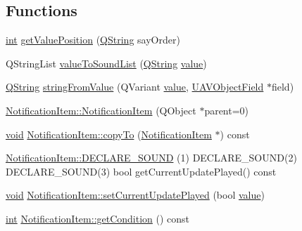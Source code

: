 \subsection*{Functions}
\begin{DoxyCompactItemize}
\item 
\hyperlink{ioapi_8h_a787fa3cf048117ba7123753c1e74fcd6}{int} \hyperlink{group__notifyplugin_ga86b5587da919e4abd0c5045f8eef27ae}{get\-Value\-Position} (\hyperlink{group___u_a_v_objects_plugin_gab9d252f49c333c94a72f97ce3105a32d}{Q\-String} say\-Order)
\item 
Q\-String\-List \hyperlink{group__notifyplugin_ga52304989291ca82805ab0749694bfbce}{value\-To\-Sound\-List} (\hyperlink{group___u_a_v_objects_plugin_gab9d252f49c333c94a72f97ce3105a32d}{Q\-String} \hyperlink{glext_8h_aa0e2e9cea7f208d28acda0480144beb0}{value})
\item 
\hyperlink{group___u_a_v_objects_plugin_gab9d252f49c333c94a72f97ce3105a32d}{Q\-String} \hyperlink{group__notifyplugin_ga16f7f909377f59dda529965c201a37a8}{string\-From\-Value} (Q\-Variant \hyperlink{glext_8h_aa0e2e9cea7f208d28acda0480144beb0}{value}, \hyperlink{class_u_a_v_object_field}{U\-A\-V\-Object\-Field} $\ast$field)
\item 
\hyperlink{group__notifyplugin_ga382be87567eab960b4bd89e2c7238ba8}{Notification\-Item\-::\-Notification\-Item} (Q\-Object $\ast$parent=0)
\item 
\hyperlink{group___u_a_v_objects_plugin_ga444cf2ff3f0ecbe028adce838d373f5c}{void} \hyperlink{group__notifyplugin_ga308d07be5a887bb4e35319a55c70fb06}{Notification\-Item\-::copy\-To} (\hyperlink{class_notification_item}{Notification\-Item} $\ast$) const 
\item 
\hyperlink{group__notifyplugin_gafd8fcfb284be8c92e29aba742748d4b8}{Notification\-Item\-::\-D\-E\-C\-L\-A\-R\-E\-\_\-\-S\-O\-U\-N\-D} (1) D\-E\-C\-L\-A\-R\-E\-\_\-\-S\-O\-U\-N\-D(2) D\-E\-C\-L\-A\-R\-E\-\_\-\-S\-O\-U\-N\-D(3) bool get\-Current\-Update\-Played() const 
\item 
\hyperlink{group___u_a_v_objects_plugin_ga444cf2ff3f0ecbe028adce838d373f5c}{void} \hyperlink{group__notifyplugin_ga3df23419f46ace03f4874972e2a14579}{Notification\-Item\-::set\-Current\-Update\-Played} (bool \hyperlink{glext_8h_aa0e2e9cea7f208d28acda0480144beb0}{value})
\item 
\hyperlink{ioapi_8h_a787fa3cf048117ba7123753c1e74fcd6}{int} \hyperlink{group__notifyplugin_ga04c987109a0ab4c1f9d719a6c0e3096a}{Notification\-Item\-::get\-Condition} () const 
\item 

\end{DoxyCompactItemize}
